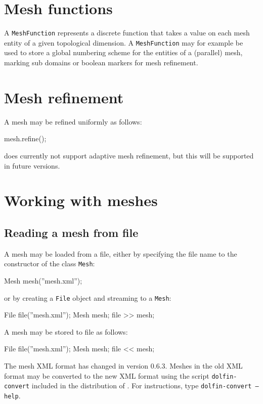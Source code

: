 \section{Mesh functions}

A \texttt{MeshFunction} represents a discrete function that takes a
value on each mesh entity of a given topological dimension.
A \texttt{MeshFunction} may for example be used to store a global
numbering scheme for the entities of a (parallel) mesh, marking
sub domains or boolean markers for mesh refinement.

\section{Mesh refinement}

A mesh may be refined uniformly as follows:
\begin{code}
  mesh.refine();
\end{code}
\dolfin{} does currently not support adaptive mesh refinement, but
this will be supported in future versions.

\section{Working with meshes}

\subsection{Reading a mesh from file}

A mesh may be loaded from a file, either by specifying the file name
to the constructor of the class \texttt{Mesh}:
\begin{code}
  Mesh mesh(''mesh.xml'');
\end{code}
or by creating a \texttt{File} object and streaming to a
\texttt{Mesh}:
\begin{code}
  File file(''mesh.xml'');
  Mesh mesh;
  file >> mesh;
\end{code}
A mesh may be stored to file as follows:
\begin{code}
  File file(''mesh.xml'');
  Mesh mesh;
  file << mesh;
\end{code}

The \dolfin{} mesh XML format has changed in \dolfin{} version
0.6.3. Meshes in the old XML format may be converted to the new XML
format using the script \texttt{dolfin-convert} included in the
distribution of \dolfin{}. For instructions, type
\texttt{dolfin-convert --help}.


